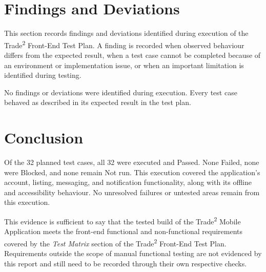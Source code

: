 \documentclass[fleqn,12pt]{article}
\newcommand{\tradesq}{Trade\textsuperscript{2}}
\begin{document}
\newpage
\section{Findings and Deviations}\label{sec:hd-testreport-findings}
This section records findings and deviations identified during execution of the \tradesq{} Front-End Test Plan. A finding is recorded when observed behaviour differs from the expected result, when a test case cannot be completed because of an environment or implementation issue, or when an important limitation is identified during testing.

No findings or deviations were identified during execution. Every test case behaved as described in its expected result in the test plan.

\newpage
\section{Conclusion}

Of the 32 planned test cases, all 32 were executed and Passed. None Failed, none were Blocked, and none remain Not run. This execution covered the application's account, listing, messaging, and notification functionality, along with its offline and accessibility behaviour. No unresolved failures or untested areas remain from this execution.

This evidence is sufficient to say that the tested build of the \tradesq{} Mobile Application meets the front-end functional and non-functional requirements covered by the \emph{Test Matrix} section of the \tradesq{} Front-End Test Plan. Requirements outside the scope of manual functional testing are not evidenced by this report and still need to be recorded through their own respective checks.

\newpage
\printbibliography
\end{document}
